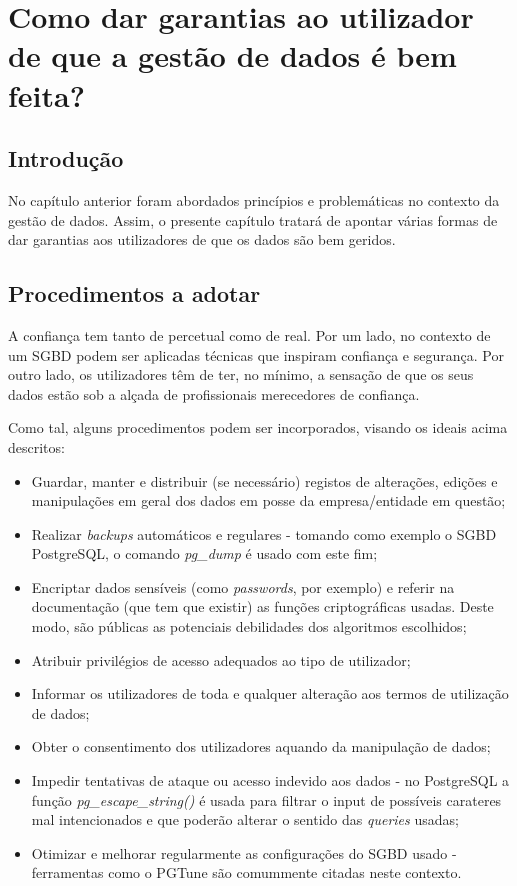 \chapter{Como dar garantias ao utilizador de que a gestão de dados é bem feita?}
\label{chap3:garantias}

\section{Introdução}
\label{chap3:intro}
No capítulo anterior foram abordados princípios e problemáticas no contexto da gestão de dados. Assim, o presente capítulo tratará de apontar várias formas de dar garantias aos utilizadores de que os dados são bem geridos.

\section{Procedimentos a adotar}
\label{chap3:procedimentos}
A confiança tem tanto de percetual como de real. Por um lado, no contexto de um \ac{SGBD} podem ser aplicadas técnicas que inspiram confiança e segurança. Por outro lado, os utilizadores têm de ter, no mínimo, a sensação de que os seus dados estão sob a alçada de profissionais merecedores de confiança. 

Como tal, alguns procedimentos \cite{etica} podem ser incorporados, visando os ideais acima descritos:

\begin{itemize}
    \item Guardar, manter e distribuir (se necessário) registos de alterações, edições e manipulações em geral dos dados em posse da empresa/entidade em questão;
    \item Realizar \textit{backups} automáticos e regulares - tomando como exemplo o \ac{SGBD} PostgreSQL, o comando \textit{pg\_dump} é usado com este fim;
    \item Encriptar dados sensíveis (como \textit{passwords}, por exemplo) e referir na documentação (que tem que existir) as funções criptográficas usadas. Deste modo, são públicas as potenciais debilidades dos algoritmos escolhidos;
    \item Atribuir privilégios de acesso adequados ao tipo de utilizador;
    \item Informar os utilizadores de toda e qualquer alteração aos termos de utilização de dados;
    \item Obter o consentimento dos utilizadores aquando da manipulação de dados;
    \item Impedir tentativas de ataque ou acesso indevido aos dados - no PostgreSQL a função \textit{pg\_escape\_string()} é usada para filtrar o input de possíveis carateres mal intencionados e que poderão alterar o sentido das \textit{queries} usadas;
    \item Otimizar e melhorar regularmente as configurações do \ac{SGBD} usado - ferramentas como o PGTune são comummente citadas neste contexto.
\end{itemize}


